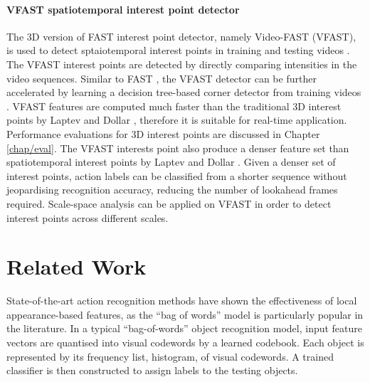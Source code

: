 \paragraph{VFAST spatiotemporal interest point detector} 
The 3D version of FAST interest point detector, namely Video-FAST (VFAST), is used to detect sptaiotemporal interest points in training and testing videos \cite{Yu2013b}.   
The VFAST interest points are detected by directly comparing intensities in the video sequences.
Similar to FAST \cite{Rosten2010}, the VFAST detector can be further accelerated by learning a decision tree-based corner detector from training videos \cite{Rosten2010}. 
VFAST features are computed much faster than the traditional 3D interest points by Laptev \cite{Laptev2005} and Dollar \etal \cite{Dollar2005}, therefore it is suitable for real-time application. Performance evaluations for 3D interest points are discussed in Chapter \ref{chap/eval}.  
The VFAST interests point also produce a denser feature set than spatiotemporal interest points by Laptev \cite{Laptev2005} and Dollar \etal \cite{Dollar2005}. 
Given a denser set of interest points, action labels can be classified from a shorter sequence without jeopardising recognition accuracy, reducing the number of lookahead frames required. 
Scale-space analysis can be applied on VFAST in order to detect interest points across different scales.



\section{Related Work}
\label{sec/act/relatedwork}
State-of-the-art action recognition methods have shown the effectiveness of local appearance-based features, as the ``bag of words'' model is particularly popular in the literature.   \cite{Dollar2005, Riemenschneider2009, Niebles2008, Schuldt2004, Wong2007} 
In a typical ``bag-of-words'' object recognition model, input feature vectors are quantised into visual codewords by a learned codebook. Each object is represented by its frequency list, \ie histogram, of visual codewords. A trained classifier is then constructed to assign labels to the testing objects.

